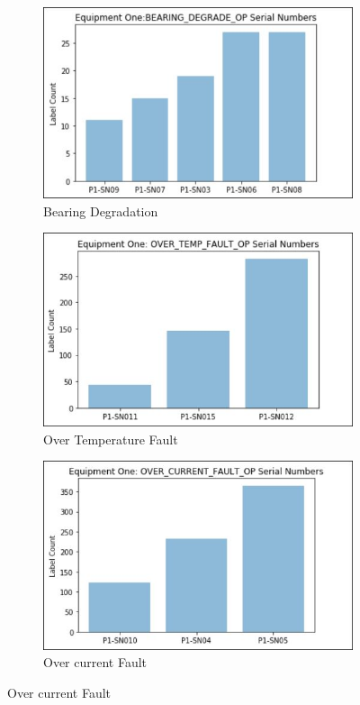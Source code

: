 \documentclass[sigconf]{acmart}
\begin{document}
\begin{figure}

\begin{subfigure}{0.9\linewidth}
\includegraphics[width=1.0\columnwidth]{images/DEGRADE}
\caption{Bearing Degradation} \label{sfig:sfig4a}
\end{subfigure}

\begin{subfigure}{0.9\linewidth}
\includegraphics[width=1.0\columnwidth]{images/OVERTEMP}
\caption{Over Temperature Fault} \label{sfig:sfig4b}
\end{subfigure}

\begin{subfigure}{0.9\linewidth}
\includegraphics[width=1.0\columnwidth]{images/OVERCURR}
\caption{Over current Fault} \label{sfig:sfig4c}
\end{subfigure}


\end{figure}
\end{document}
